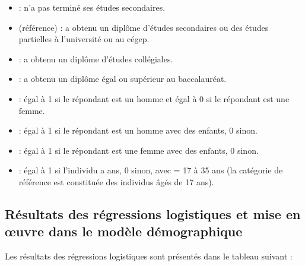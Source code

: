 \documentclass[letterpaper,10pt,french]{sphinxmanual}
\begin{document}
\begin{itemize}
\item {} 
 : n’a pas terminé ses études secondaires.

\item {} 
 (référence) : a obtenu un diplôme d’études secondaires ou des études partielles à l’université ou au cégep.

\item {} 
 : a obtenu un diplôme d’études collégiales.

\item {} 
 : a obtenu un diplôme égal ou supérieur au baccalauréat.

\end{itemize}

\begin{itemize}
\item {} 
 : égal à 1 si le répondant est un homme et égal à 0 si le répondant est une femme.

\item {} 
 : égal à 1 si le répondant est un homme avec des enfants, 0 sinon.

\item {} 
 : égal à 1 si le répondant est une femme avec des enfants, 0 sinon.

\item {} 
 : égal à 1 si l’individu a  ans, 0 sinon, avec  = 17 à 35 ans (la catégorie de référence est constituée des individus âgés de 17 ans).

\end{itemize}


\subsection{Résultats des régressions logistiques et mise en œuvre dans le modèle démographique}
\label{\detokenize{transition_models:resultats-des-regressions-logistiques-et-mise-en-oeuvre-dans-le-modele-demographique}}
Les résultats des régressions logistiques sont présentés dans le tableau suivant :
\end{document}
